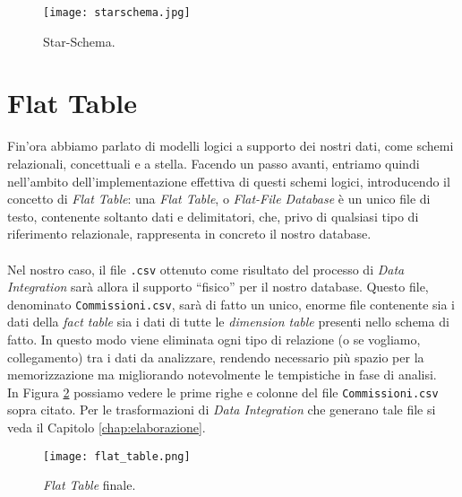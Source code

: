 		\begin{figure}[h!]
			\centering
				\texttt{[image: starschema.jpg]}
			\caption{Star-Schema.}
			\label{fig:starschema}
		\end{figure}
		
	
	\section{Flat Table} \label{sec:flat_table}
	
		Fin'ora abbiamo parlato di modelli logici a supporto dei nostri dati, come schemi relazionali, concettuali e a stella. Facendo un passo avanti, entriamo quindi nell'ambito dell'implementazione effettiva di questi schemi logici, introducendo il concetto di \textit{Flat Table}: una \textit{Flat Table}, o \textit{Flat-File Database} è un unico file di testo, contenente soltanto dati e delimitatori, che, privo di qualsiasi tipo di riferimento relazionale, rappresenta in concreto il nostro database.\\
		\\
		Nel nostro caso, il file \texttt{.csv} ottenuto come risultato del processo di \textit{Data Integration} sarà allora il supporto ``fisico'' per il nostro database. Questo file, denominato \texttt{Commissioni.csv}, sarà di fatto un unico, enorme file contenente sia i dati della \textit{fact table} sia i dati di tutte le \textit{dimension table} presenti nello schema di fatto. In questo modo viene eliminata ogni tipo di relazione (o se vogliamo, collegamento) tra i dati da analizzare, rendendo necessario più spazio per la memorizzazione ma migliorando notevolmente le tempistiche in fase di analisi.\\
		In Figura \ref{fig:flat_table} possiamo vedere le prime righe e colonne del file \texttt{Commissioni.csv} sopra citato. Per le trasformazioni di \textit{Data Integration} che generano tale file si veda il Capitolo \ref{chap:elaborazione}.
		
		\begin{figure}[h!]
			\centering
				\texttt{[image: flat\_table.png]}
			\caption{\textit{Flat Table} finale.}
			\label{fig:flat_table}
		\end{figure}
